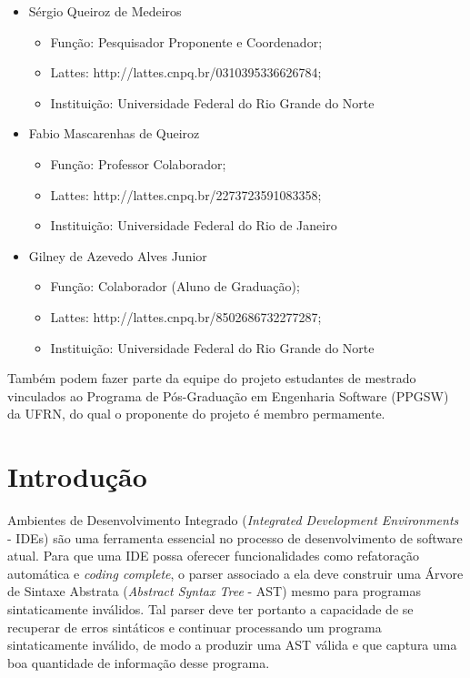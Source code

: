 \documentclass[titlepage,12pt]{article}
\begin{document}
\begin{itemize}
	\item Sérgio Queiroz de Medeiros
	\begin{itemize}
    \item Função: Pesquisador Proponente e Coordenador;
		\item Lattes: http://lattes.cnpq.br/0310395336626784; 
	  \item Instituição: Universidade Federal do Rio Grande do Norte 
	\end{itemize}

  \item Fabio Mascarenhas de Queiroz
	\begin{itemize}
    \item Função: Professor Colaborador;
		\item Lattes: http://lattes.cnpq.br/2273723591083358; 
	  \item Instituição: Universidade Federal do Rio de Janeiro
	\end{itemize}

  \item Gilney de Azevedo Alves Junior
	\begin{itemize}
    \item Função: Colaborador (Aluno de Graduação);
		\item Lattes: http://lattes.cnpq.br/8502686732277287; 
	  \item Instituição: Universidade Federal do Rio Grande do Norte
	\end{itemize}
\end{itemize}


Também podem fazer parte da equipe do projeto estudantes de mestrado vinculados
ao Programa de Pós-Graduação em Engenharia Software (PPGSW) da UFRN, 
do qual o proponente do projeto é membro permamente.


\section{Introdução}
\label{sec:intro}


Ambientes de Desenvolvimento Integrado (\textit{Integrated Development Environments} - IDEs)
são uma ferramenta essencial no processo de desenvolvimento de software atual.
Para que uma IDE possa oferecer funcionalidades como refatoração automática 
e \textit{coding complete}, o parser associado a ela deve construir uma Árvore de
Sintaxe Abstrata (\textit{Abstract Syntax Tree} - AST) mesmo para programas sintaticamente
inválidos. Tal parser deve ter portanto a capacidade de se recuperar de erros sintáticos
e continuar processando um programa sintaticamente inválido, de modo a produzir uma AST
válida e que captura uma boa quantidade de informação desse programa.
\end{document}
